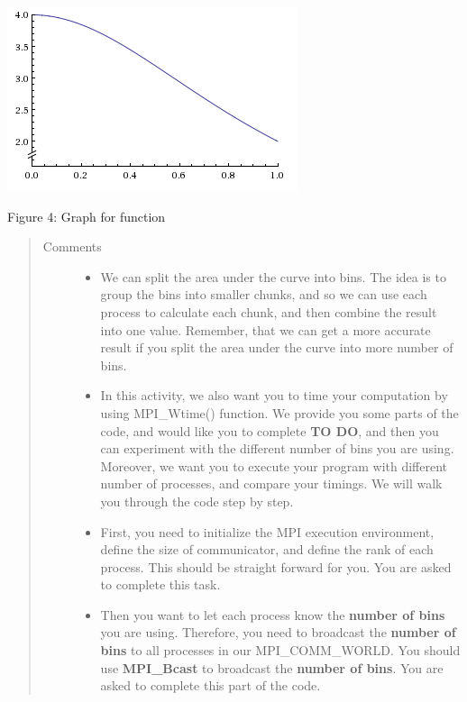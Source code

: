 \documentclass[letterpaper,10pt,openany,oneside]{sphinxmanual}
\begin{document}
{\hfill\includegraphics{graph.png}\hfill}

\begin{center}Figure 4: Graph for function
\end{center}\begin{quote}\begin{description}
\item[{Comments}] \leavevmode\begin{itemize}
\item {} 
We can split the area under the curve into bins. The idea is to group the bins into smaller chunks, and so we can use each process to calculate each chunk, and then combine the result into one value. Remember, that we can get a more accurate result if you split the area under the curve into more number of bins.

\item {} 
In this activity, we also want you to time your computation by using MPI\_Wtime() function. We provide you some parts of the code, and would like you to complete \textbf{TO DO}, and then you can experiment with the different number of bins you are using. Moreover,  we want you to execute your program with different number of processes, and compare your timings. We will walk you through the code step by step.

\item {} 
First, you need to initialize the MPI execution environment, define the size of communicator, and define the rank of each process. This should be straight forward for you. You are asked to complete this task.

\item {} 
Then you want to let each process know the \textbf{number of bins} you are using. Therefore, you need to broadcast the \textbf{number of bins} to all processes in our MPI\_COMM\_WORLD. You should use \textbf{MPI\_Bcast} to broadcast the \textbf{number of bins}. You are asked to complete this part of the code.


\end{itemize}
\end{description}
\end{quote}
\end{document}
